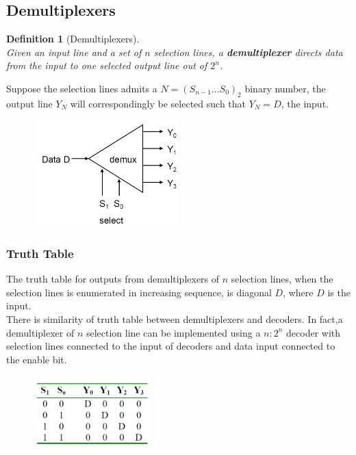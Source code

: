\documentclass[12pt]{article}
\newtheorem{definition}{Definition}[section]
\theoremstyle{definition}
\begin{document}
\subsection{Demultiplexers}
\begin{definition}[Demultiplexers]
\hfill\\\normalfont Given an input line and a set of $n$ selection lines, a \textbf{demultiplexer} directs data from the input to \textit{one} selected output line out of $2^n$.
\end{definition}
Suppose the selection lines admits a $N=(S_{n-1}\ldots S_0)_2$ binary number, the output line $Y_N$ will correspondingly be selected such that $Y_N = D$, the input.
\begin{figure}[h]
\centering
\includegraphics[width = 0.5\textwidth]{7_4.png}
\end{figure}
\subsubsection{Truth Table}
The truth table for outputs from demultiplexers of $n$ selection lines, when the selection lines is enumerated in increasing sequence, is diagonal $D$, where $D$ is the input.\\There is similarity of truth table between demultiplexers and decoders. In fact,a demultiplexer of $n$ selection line can be implemented using a $n:2^n$ decoder with selection lines connected to the input of decoders and data input connected to the enable bit.
\begin{figure}[h]
\centering
\includegraphics[width = 0.4\textwidth]{7_5.png}
\end{figure}
\end{document}
